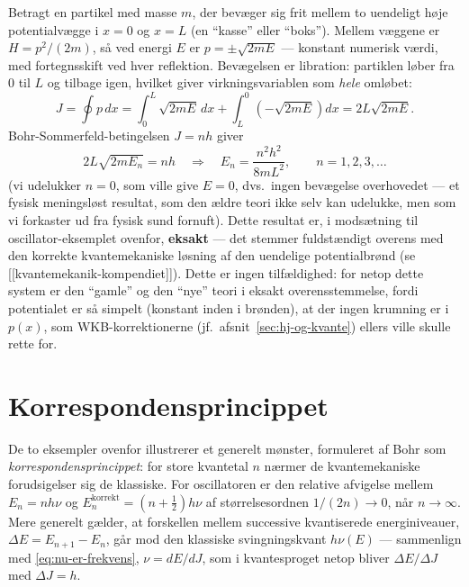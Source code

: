 \begin{eksempel}
Betragt en partikel med masse $m$, der bevæger sig frit mellem to
uendeligt høje potentialvægge i $x=0$ og $x=L$ (en ``kasse'' eller
``boks''). Mellem væggene er $H=p^2/(2m)$, så ved energi $E$ er
$p=\pm\sqrt{2mE}$ — konstant numerisk værdi, med fortegnsskift ved hver
reflektion. Bevægelsen er libration: partiklen løber fra $0$ til $L$
og tilbage igen, hvilket giver virkningsvariablen som \emph{hele}
omløbet:
\begin{equation}
  J = \oint p\,dx = \int_0^L\sqrt{2mE}\,dx + \int_L^0\left(-\sqrt{2mE}\right)dx
    = 2L\sqrt{2mE}.
\end{equation}
Bohr-Sommerfeld-betingelsen $J=nh$ giver
\begin{equation}
  2L\sqrt{2mE_n} = nh
  \quad\Longrightarrow\quad
  \boxed{E_n = \frac{n^2h^2}{8mL^2}, \qquad n=1,2,3,\dots}
\end{equation}
(vi udelukker $n=0$, som ville give $E=0$, dvs.\ ingen bevægelse
overhovedet — et fysisk meningsløst resultat, som den ældre teori ikke
selv kan udelukke, men som vi forkaster ud fra fysisk sund fornuft).
Dette resultat er, i modsætning til oscillator-eksemplet ovenfor,
\textbf{eksakt} — det stemmer fuldstændigt overens med den korrekte
kvantemekaniske løsning af den uendelige potentialbrønd (se
[[kvantemekanik-kompendiet]]). Dette er ingen tilfældighed: for netop
dette system er den ``gamle'' og den ``nye'' teori i eksakt overensstemmelse,
fordi potentialet er så simpelt (konstant inden i brønden), at der
ingen krumning er i $p(x)$, som WKB-korrektionerne (jf.\
afsnit~\ref{sec:hj-og-kvante}) ellers ville skulle rette for.
\end{eksempel}

\section{Korrespondensprincippet}

De to eksempler ovenfor illustrerer et generelt mønster, formuleret af
Bohr som \emph{korrespondensprincippet}\index{korrespondensprincippet}: for store kvantetal $n$
nærmer de kvantemekaniske forudsigelser sig de klassiske. For
oscillatoren er den relative afvigelse mellem $E_n=nh\nu$ og
$E_n^{\text{korrekt}}=(n+\frac12)h\nu$ af størrelsesordnen $1/(2n)\to0$,
når $n\to\infty$. Mere generelt gælder, at forskellen mellem
successive kvantiserede energiniveauer, $\Delta E=E_{n+1}-E_n$, går mod
den klassiske svingningskvant $h\nu(E)$ — sammenlign med
\eqref{eq:nu-er-frekvens}, $\nu=dE/dJ$, som i kvantesproget netop
bliver $\Delta E/\Delta J$ med $\Delta J=h$.

